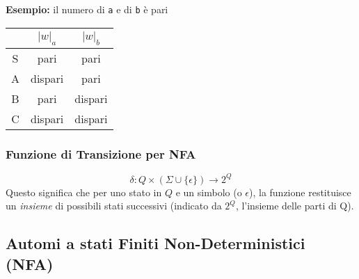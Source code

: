         \vspace{1em}
        
        \textbf{Esempio:} il numero di \texttt{a} e di \texttt{b} è pari
        
        \begin{minipage}{0.4\textwidth}
        \centering
        \begin{tabular}{|c|c|c|}
        \hline
             & $|w|_a$ & $|w|_b$ \\
        \hline
         S & pari    & pari    \\
        \hline
         A & dispari & pari    \\
        \hline
         B & pari    & dispari \\
        \hline
         C & dispari & dispari \\
        \hline
        \end{tabular}
        \end{minipage}%
        \hfill
        \begin{minipage}{0.58\textwidth}
        \centering
        \end{minipage}
        
\subsubsection{Funzione di Transizione per NFA}
\[ \delta: Q \times (\Sigma \cup \{\epsilon\}) \rightarrow 2^Q \]
Questo significa che per uno stato in $Q$ e un simbolo (o $\epsilon$), la funzione restituisce un \textit{insieme} di possibili stati successivi (indicato da $2^Q$, l'insieme delle parti di Q). 

\subsection{Automi a stati Finiti Non-Deterministici (NFA)}


